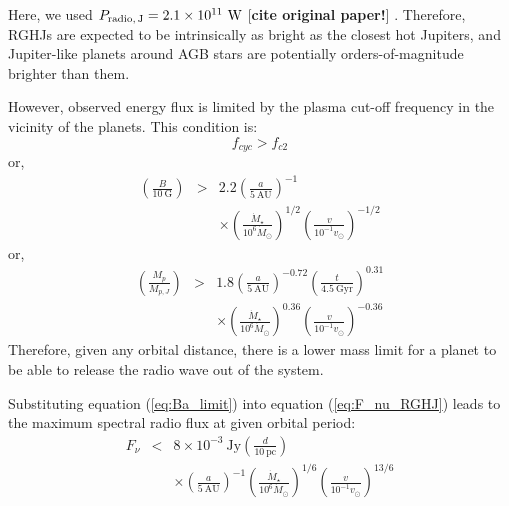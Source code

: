 \documentclass{emulateapj}
\def\memoYF#1{\color{red}$[${\bf #1}$]$ \color{black}}
\begin{document}
Here, we used $P_{\rm radio,\,J}=2.1\times 10^{11}\mbox{~W}$ \citep{griebmeier2007} \memoYF{cite original paper!}. 
Therefore, RGHJs are expected to be intrinsically as bright as the closest hot Jupiters, and Jupiter-like planets around AGB stars are potentially orders-of-magnitude brighter than them. 


However, observed energy flux is limited by the plasma cut-off frequency in the vicinity of the planets. 
This condition is:
\begin{equation}
 f_{cyc} > f_{c2}
\end{equation} 
or, 
\begin{eqnarray}
 \left( \frac{B}{10~\mbox{G}} \right) &>& 2.2 \left( \frac{a}{5~\mbox{AU}} \right)^{-1} \\
 && \times \left( \frac{\dot M_{\star }}{10^6 \dot M_{\odot}} \right)^{1/2}  \left( \frac{v}{10^{-1}v_{\odot}} \right)^{-1/2} \label{eq:Ba_limit}
\end{eqnarray}
or, 
\begin{eqnarray}
 \left( \frac{M_p}{M_{p,J}} \right) &> & 1.8 \left( \frac{a}{5~\mbox{AU}} \right)^{-0.72} \left( \frac{t}{4.5~\mbox{Gyr}} \right)^{0.31} \\
 && \times \left( \frac{\dot M_{\star }}{10^6 \dot M_{\odot}} \right)^{0.36}  \left( \frac{v}{10^{-1}v_{\odot}} \right)^{-0.36} \label{eq:Ma_limit}
\end{eqnarray}
% 
Therefore, given any orbital distance, there is a lower mass limit for a planet to be able to release the  radio wave out of the system. 

Substituting equation (\ref{eq:Ba_limit}) into equation (\ref{eq:F_nu_RGHJ}) leads to the maximum spectral radio flux at given orbital period:
\begin{eqnarray}
F_{\nu} &<& 8 \times 10^{-3}~\mbox{Jy} \left( \frac{d}{10~\mbox{pc}} \right) \\
&& \times \left( \frac{a}{5~\mbox{AU}} \right)^{-1}  \left( \frac{\dot M_{\star }}{10^6 \dot M_{\odot}} \right)^{1/6} \left( \frac{v}{10^{-1} v_{\odot}} \right)^{13/6}
\end{eqnarray}
\end{document}
